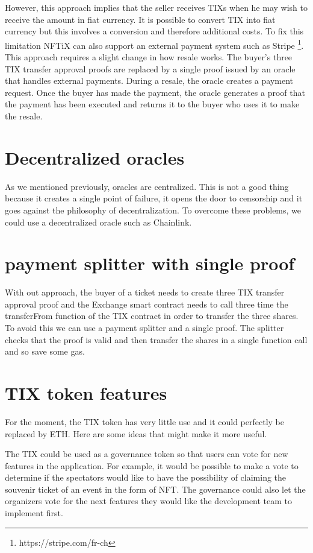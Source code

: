 \documentclass[a4paper,11pt,oneside]{report}
\begin{document}
However, this approach implies that the seller receives TIXs when he may wish to receive the amount in fiat currency. It is possible to convert TIX into fiat currency but this involves a conversion and therefore additional costs. To fix this limitation NFTiX can also support an external payment system such as Stripe \footnote{https://stripe.com/fr-ch}. This approach requires a slight change in how resale works. The buyer's three TIX transfer approval proofs are replaced by a single proof issued by an oracle that handles external payments. During a resale, the oracle creates a payment request. Once the buyer has made the payment, the oracle generates a proof that the payment has been executed and returns it to the buyer who uses it to make the resale.

\section{Decentralized oracles}
As we mentioned previously, oracles are centralized. This is not a good thing because it creates a single point of failure, it opens the door to censorship and it goes against the philosophy of decentralization. To overcome these problems, we could use a decentralized oracle such as Chainlink.

\section{payment splitter with single proof}
With out approach, the buyer of a ticket needs to create three TIX transfer approval proof and the Exchange smart contract needs to call three time the transferFrom function of the TIX contract in order to transfer the three shares. To avoid this we can use a payment splitter and a single proof. The splitter checks that the proof is valid and then transfer the shares in a single function call and so save some gas. 

\section{TIX token features}
For the moment, the TIX token has very little use and it could perfectly be replaced by ETH. Here are some ideas that might make it more useful.

The TIX could be used as a governance token so that users can vote for new features in the application. For example, it would be possible to make a vote to determine if the spectators would like to have the possibility of claiming the souvenir ticket of an event in the form of NFT. The governance could also let the organizers vote for the next features they would like the development team to implement first.
\end{document}
